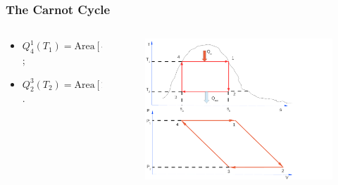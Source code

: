\documentclass[10pt,compress]{beamer}
\begin{document}
\begin{frame}
 \frametitle{The Carnot Cycle}
  \begin{columns}
   \begin{column}[c]{0.5\linewidth}
     \begin{itemize}
      \item <1-> $Q_{4}^{1}\left(T_{1}\right) = \text{Area}\left[ 4-1-s_{a}-s_{b}\right] = T_{1}\left(s_{1}-s_{4}\right) = T_{1}\left(s_{2}-s_{3}\right)$;
\medskip
      \item <2-> $Q_{2}^{3}\left(T_{2}\right) = \text{Area}\left[2-3-s_{a}-s_{b}\right] = T_{2}\left(s_{2}-s_{3}\right)$.
    \end{itemize} 

   \end{column}
   \begin{column}[c]{0.5\linewidth}
   \begin{figure}%
    \begin{center}
     \includegraphics[width=8.cm,clip]{./Pics/Carnot_PV_TS}
    \end{center}
   \end{figure}    

   \end{column}
  \end{columns}
 \normalsize
\end{frame}
\end{document}
